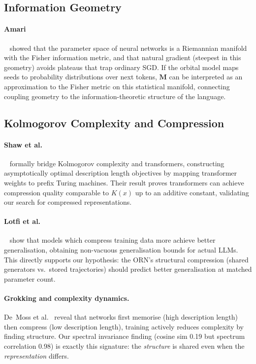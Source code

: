 \documentclass[11pt, a4paper]{article}
\newcommand{\M}{\mathbf{M}}
\theoremstyle{remark}
\begin{document}
\subsection{Information Geometry}

\paragraph{Amari}~\cite{amari2019fisher} showed that the parameter space of neural networks is a Riemannian manifold with the Fisher information metric, and that natural gradient (steepest in this geometry) avoids plateaus that trap ordinary SGD.
If the orbital model maps seeds to probability distributions over next tokens, $\M$ can be interpreted as an approximation to the Fisher metric on this statistical manifold, connecting coupling geometry to the information-theoretic structure of the language.

\subsection{Kolmogorov Complexity and Compression}

\paragraph{Shaw et al.}~\cite{shaw2026kolmogorov} formally bridge Kolmogorov complexity and transformers, constructing asymptotically optimal description length objectives by mapping transformer weights to prefix Turing machines.
Their result proves transformers can achieve compression quality comparable to $K(x)$ up to an additive constant, validating our search for compressed representations.

\paragraph{Lotfi et al.}~\cite{lotfi2024compression} show that models which compress training data more achieve better generalisation, obtaining non-vacuous generalisation bounds for actual LLMs.
This directly supports our hypothesis: the ORN's structural compression (shared generators vs.\ stored trajectories) should predict better generalisation at matched parameter count.

\paragraph{Grokking and complexity dynamics.}
De~Moss et al.~\cite{demoss2024grokking} reveal that networks first memorise (high description length) then compress (low description length), training actively reduces complexity by finding structure.
Our spectral invariance finding (cosine sim 0.19 but spectrum correlation 0.98) is exactly this signature: the \emph{structure} is shared even when the \emph{representation} differs.
\end{document}
